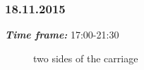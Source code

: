 \subsubsection{18.11.2015}
\textit{\textbf{Time frame:}} 17:00-21:30 \newline


\begin{figure}[H]
	\begin{minipage}[h]{1\linewidth}
		\caption{two sides of the carriage}
	\end{minipage}
\end{figure}

